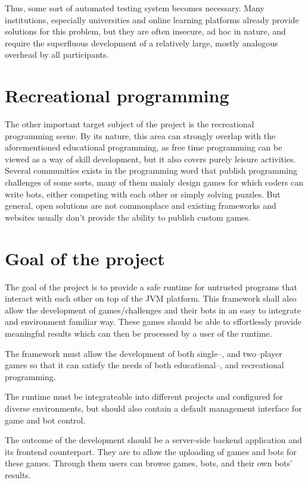 	Thus, some sort of automated testing system becomes necessary. Many institutions, especially universities and online learning platforms already provide solutions for this problem, but they are often insecure, ad hoc in nature, and require the superfluous development of a relatively large, mostly analogous overhead by all participants.
	
	\section{Recreational programming}

	The other important target subject of the project is the recreational programming scene. By its nature, this area can strongly overlap with the aforementioned educational programming, as free time programming can be viewed as a way of skill development, but it also covers purely leisure activities. Several communities exists in the programming word that publish programming challenges of some sorts, many of them mainly design games for which coders can write bots, either competing with each other or simply solving puzzles. But general, open solutions are not commonplace and existing frameworks and websites usually don't provide the ability to publish custom games. 

	\section{Goal of the project}
	
	The goal of the project is to provide a safe runtime for untrusted programs that interact with each other on top of the JVM platform. This framework shall also allow the development of games/challenges and their bots in an easy to integrate and environment familiar way. These games should be able to effortlessly provide meaningful results which can then be processed by a user of the runtime.
	
	The framework must allow the development of both single--, and two--player games so that it can satisfy the needs of both educational--, and recreational programming.
	
	The runtime must be integrateable into different projects and configured for diverse environments, but should also contain a default management interface for game and bot control. 

	The outcome of the development should be a server-side backend application and its frontend counterpart. They are to allow the uploading of games and bots for these games. Through them users can browse games, bots, and their own bots' results.
	
